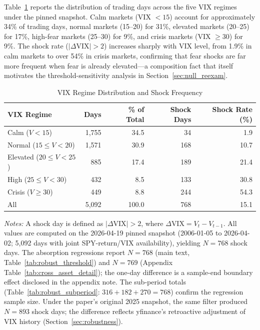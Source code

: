\documentclass[12pt,a4paper]{article}
\begin{document}
Table~\ref{tab:regime_dist} reports the distribution of trading days across the five VIX regimes under the pinned snapshot. Calm markets (VIX $< 15$) account for approximately 34\% of trading days, normal markets (15--20) for 31\%, elevated markets (20--25) for 17\%, high-fear markets (25--30) for 9\%, and crisis markets (VIX $\geq 30$) for 9\%. The shock rate ($|\Delta\text{VIX}| > 2$) increases sharply with VIX level, from 1.9\% in calm markets to over 54\% in crisis markets, confirming that fear shocks are far more frequent when fear is already elevated---a composition fact that itself motivates the threshold-sensitivity analysis in Section~\ref{sec:null_reexam}.

\begin{table}[H]
\centering
\caption{VIX Regime Distribution and Shock Frequency}
\label{tab:regime_dist}
\begin{threeparttable}
\begin{tabular}{lrrrr}
\toprule
VIX Regime & Days & \% of Total & Shock Days & Shock Rate (\%) \\
\midrule
Calm ($V < 15$)              & 1,755 & 34.5 &  34 &  1.9 \\
Normal ($15 \leq V < 20$)    & 1,571 & 30.9 & 168 & 10.7 \\
Elevated ($20 \leq V < 25$)  &   885 & 17.4 & 189 & 21.4 \\
High ($25 \leq V < 30$)      &   432 &  8.5 & 133 & 30.8 \\
Crisis ($V \geq 30$)         &   449 &  8.8 & 244 & 54.3 \\
\addlinespace
All                           & 5,092 & 100.0 & 768 & 15.1 \\
\bottomrule
\end{tabular}
\begin{tablenotes}
\small
\item \textit{Notes:} A shock day is defined as $|\Delta\text{VIX}| > 2$, where $\Delta\text{VIX} = V_t - V_{t-1}$. All values are computed on the 2026-04-19 pinned snapshot (2006-01-05 to 2026-04-02; 5{,}092 days with joint SPY-return/VIX availability), yielding $N = 768$ shock days. The absorption regressions report $N = 768$ (main text, Table~\ref{tab:robust_threshold}) and $N = 769$ (Appendix Table~\ref{tab:cross_asset_detail}); the one-day difference is a sample-end boundary effect disclosed in the appendix note. The sub-period totals (Table~\ref{tab:robust_subperiod}: $316 + 182 + 270 = 768$) confirm the regression sample size. Under the paper's original 2025 snapshot, the same filter produced $N = 893$ shock days; the difference reflects yfinance's retroactive adjustment of VIX history (Section~\ref{sec:robustness}).
\end{tablenotes}
\end{threeparttable}
\end{table}
\end{document}
